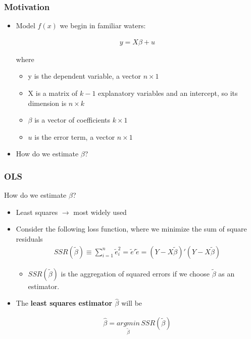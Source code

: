 \documentclass[
  shownotes,
  xcolor={svgnames},
  hyperref={colorlinks,citecolor=DarkBlue,linkcolor=DarkRed,urlcolor=DarkBlue}
  ]{beamer}
\begin{document}
\begin{frame}
\frametitle{Motivation}

\begin{itemize}
\item Model $f(x)$ we begin in familiar waters:

\begin{align}
y = X \beta +u
\end{align}

where 
\begin{itemize}
  \item y is the dependent variable, a vector $n \times 1$ 
  \item X is a matrix of $k-1$ explanatory variables and an intercept, so its dimension is $n \times k$ 
  \item $\beta$ is a vector of coefficients $k \times 1$ 
  \item $u$ is the error term, a vector $n \times 1$ 
\end{itemize}

\bigskip
\item How do we estimate $\beta$?

\end{itemize}
\end{frame}


\begin{frame}
\frametitle{OLS}
How do we estimate $\beta$?

\begin{itemize}
  \item Least squares $\rightarrow$ most widely used
  \item Consider the following loss function, where we minimize the sum of square residuals
\begin{align}
  SSR(\tilde \beta) \equiv \sum_{i=1}^n \tilde e_i^2 = \tilde e' \tilde e  = (Y-X \tilde \beta)'(Y-X \tilde \beta)
\end{align}
  \begin{itemize}
    \footnotesize
  \item $SSR(\tilde \beta)$ is the aggregation of squared errors if we choose $\tilde \beta$ as an estimator.
  \end{itemize}  

  \bigskip

    \item The {\bf least squares estimator $\hat \beta$} will be

    \begin{align}
      \hat \beta = \underset{\tilde \beta}{argmin}\, SSR(\tilde \beta)
    \end{align}

\end{itemize}

\end{frame}
\end{document}
